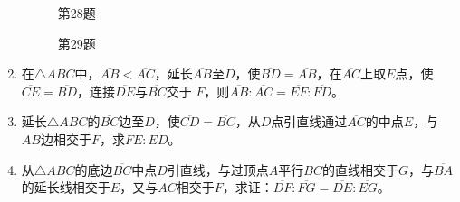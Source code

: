 \begin{enumerate}
\begin{figure}
    \begin{minipage}[t]{0.48\linewidth}
    \centering
\begin{tikzpicture}[>=latex, scale=1]
    \end{tikzpicture}
    \caption*{第28题}
    \end{minipage}
    \begin{minipage}[t]{0.48\linewidth}
    \centering
    \begin{tikzpicture}[>=latex, scale=1]
    \end{tikzpicture}
    \caption*{第29题}
    \end{minipage}
    \end{figure}

\item 在$\triangle ABC$中，$\overline{AB}<\overline{AC}$，延长$\overline{AB}$至$D$，使$\overline{BD}=\overline{AB}$，在$\overline{AC}$上取$E$点，使$\overline{CE}=\overline{BD}$，连接$\overline{DE}$与$\overline{BC}$交于 $F$，则$\overline{AB}:\overline{AC}=\overline{EF}:\overline{FD}$。
\item 延长$\triangle ABC$的$\overline{BC}$边至$D$，使$\overline{CD}=\overline{BC}$，从$D$点引直线通过$\overline{AC}$的中点$E$，与$\overline{AB}$边相交于$F$，求$\overline{FE}:\overline{ED}$。
\item 从$\triangle ABC$的底边$\overline{BC}$中点$D$引直线，与过顶点$A$平行$BC$的直线相交于$G$，与$\overline{BA}$的延长线相交于$E$，又与$AC$相交于$F$，求证：$\overline{DF}:\overline{FG}=\overline{DE}:\overline{EG}$。


\end{enumerate}
